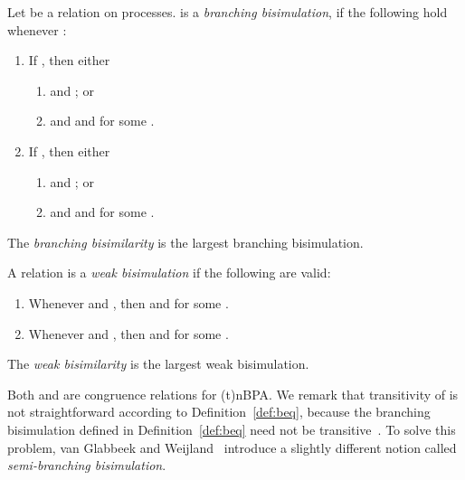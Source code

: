 \documentclass{llncs}
\begin{document}
\begin{definition}\label{def:beq}
Let  be a relation on processes.  is a {\em branching bisimulation},  if the following hold whenever :
\begin{enumerate}
\item
If , then either
 \begin{enumerate}
  \item
   and ; or

 \item
     and  and  for some .
 \end{enumerate}

\item
If  , then either
 \begin{enumerate}
 \item
     and
    ; or

 \item
  and  and  for some .
    \end{enumerate}
\end{enumerate}
The {\em branching bisimilarity}   is the largest branching bisimulation.
\end{definition}

\begin{definition}
A relation  is a {\em weak bisimulation} if the following are valid:
\begin{enumerate}
\item
Whenever  and , then  and  for some .
\item
Whenever  and , then  and  for some .
\end{enumerate}
The {\em weak bisimilarity}  is the largest weak bisimulation.
\end{definition}

Both  and  are congruence relations for (t)nBPA. We remark that transitivity of  is not straightforward according to Definition~\ref{def:beq}, because the branching bisimulation  defined in Definition~\ref{def:beq} need not be transitive~\cite{DBLP:journals/ipl/Basten96}.  To solve this problem, van Glabbeek and Weijland~\cite{GlabbeekW96} introduce a slightly different notion called {\em semi-branching bisimulation}.
\end{document}

